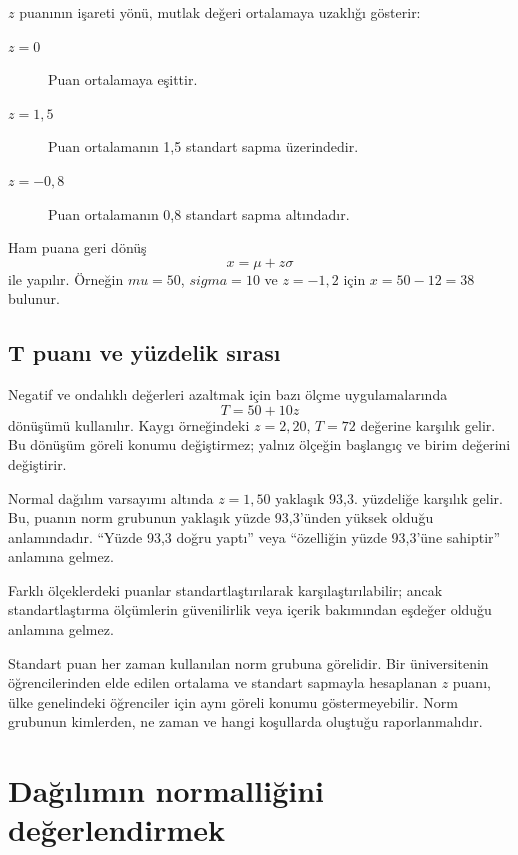 $z$ puanının işareti yönü, mutlak değeri ortalamaya uzaklığı gösterir:

\begin{description}
  \item[$z=0$] Puan ortalamaya eşittir.
  \item[$z=1{,}5$] Puan ortalamanın 1,5 standart sapma üzerindedir.
  \item[$z=-0{,}8$] Puan ortalamanın 0,8 standart sapma altındadır.
\end{description}

Ham puana geri dönüş
\[
x=\mu+z\sigma
\]
ile yapılır. Örneğin $mu=50$, $sigma=10$ ve $z=-1{,}2$ için
$x=50-12=38$ bulunur.

\subsection{T puanı ve yüzdelik sırası}

Negatif ve ondalıklı değerleri azaltmak için bazı ölçme uygulamalarında
\[
T=50+10z
\]
dönüşümü kullanılır. Kaygı örneğindeki $z=2{,}20$, $T=72$ değerine karşılık
gelir. Bu dönüşüm göreli konumu değiştirmez; yalnız ölçeğin başlangıç ve birim
değerini değiştirir.

Normal dağılım varsayımı altında $z=1{,}50$ yaklaşık 93,3. yüzdeliğe karşılık
gelir. Bu, puanın norm grubunun yaklaşık yüzde 93,3'ünden yüksek olduğu
anlamındadır. ``Yüzde 93,3 doğru yaptı'' veya ``özelliğin yüzde 93,3'üne
sahiptir'' anlamına gelmez.

Farklı ölçeklerdeki puanlar standartlaştırılarak karşılaştırılabilir; ancak
standartlaştırma ölçümlerin güvenilirlik veya içerik bakımından eşdeğer olduğu
anlamına gelmez.

\begin{researchbox}
Standart puan her zaman kullanılan norm grubuna görelidir. Bir üniversitenin
öğrencilerinden elde edilen ortalama ve standart sapmayla hesaplanan $z$ puanı,
ülke genelindeki öğrenciler için aynı göreli konumu göstermeyebilir. Norm
grubunun kimlerden, ne zaman ve hangi koşullarda oluştuğu raporlanmalıdır.
\end{researchbox}

\section{Dağılımın normalliğini değerlendirmek}

